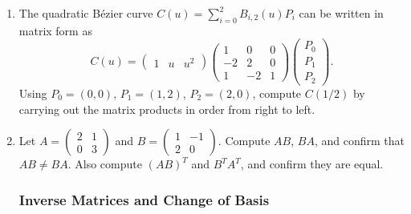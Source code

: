\begin{enumerate}
\begin{enumerate}
  \item $\begin{pmatrix} 1 & 0 & 2 \\ 0 & 1 & -1 \end{pmatrix}
         \begin{pmatrix} 2 \\ -1 \\ 3 \end{pmatrix}$

  \item $\begin{pmatrix} 2 \\ -1 \\ 3 \end{pmatrix}
         \begin{pmatrix} 1 & 0 & -1 \end{pmatrix}$
\end{enumerate}

\item The quadratic Bézier curve $C(u) = \sum_{i=0}^2 B_{i,2}(u) P_i$ can be
written in matrix form as
\[
  C(u) = \begin{pmatrix} 1 & u & u^2 \end{pmatrix}
         \begin{pmatrix} 1 & 0 & 0 \\ -2 & 2 & 0 \\ 1 & -2 & 1 \end{pmatrix}
         \begin{pmatrix} P_0 \\ P_1 \\ P_2 \end{pmatrix}.
\]
Using $P_0 = (0,0)$, $P_1 = (1,2)$, $P_2 = (2,0)$, compute $C(1/2)$
by carrying out the matrix products in order from right to left.

\item Let
$A = \begin{pmatrix} 2 & 1 \\ 0 & 3 \end{pmatrix}$
and
$B = \begin{pmatrix} 1 & -1 \\ 2 & 0 \end{pmatrix}$.
Compute $AB$, $BA$, and confirm that $AB \neq BA$.
Also compute $(AB)^T$ and $B^T A^T$, and confirm they are equal.

\subsubsection*{Inverse Matrices and Change of Basis}


\end{enumerate}
